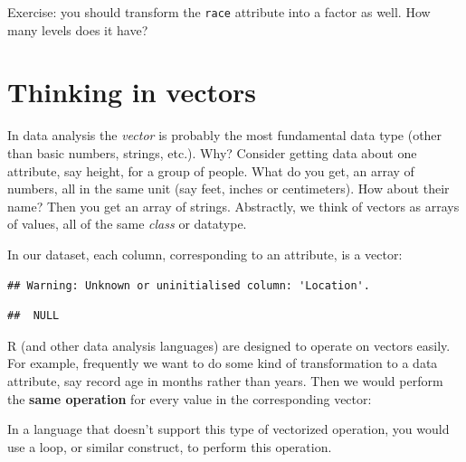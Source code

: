 \documentclass[]{book}
\newenvironment{Shaded}{\begin{snugshade}}{\end{snugshade}}
\newcommand{\KeywordTok}[1]{\textcolor[rgb]{0.13,0.29,0.53}{\textbf{#1}}}
\newcommand{\DecValTok}[1]{\textcolor[rgb]{0.00,0.00,0.81}{#1}}
\newcommand{\StringTok}[1]{\textcolor[rgb]{0.31,0.60,0.02}{#1}}
\newcommand{\CommentTok}[1]{\textcolor[rgb]{0.56,0.35,0.01}{\textit{#1}}}
\newcommand{\OperatorTok}[1]{\textcolor[rgb]{0.81,0.36,0.00}{\textbf{#1}}}
\newcommand{\NormalTok}[1]{#1}
\theoremstyle{definition}
\theoremstyle{definition}
\theoremstyle{remark}
\begin{document}
Exercise: you should transform the \texttt{race} attribute into a factor
as well. How many levels does it have?

\section{Thinking in vectors}\label{thinking-in-vectors}

In data analysis the \emph{vector} is probably the most fundamental data
type (other than basic numbers, strings, etc.). Why? Consider getting
data about one attribute, say height, for a group of people. What do you
get, an array of numbers, all in the same unit (say feet, inches or
centimeters). How about their name? Then you get an array of strings.
Abstractly, we think of vectors as arrays of values, all of the same
\emph{class} or datatype.

In our dataset, each column, corresponding to an attribute, is a vector:

\begin{Shaded}
\end{Shaded}

\begin{verbatim}
## Warning: Unknown or uninitialised column: 'Location'.
\end{verbatim}

\begin{verbatim}
##  NULL
\end{verbatim}

R (and other data analysis languages) are designed to operate on vectors
easily. For example, frequently we want to do some kind of
transformation to a data attribute, say record age in months rather than
years. Then we would perform the \textbf{same operation} for every value
in the corresponding vector:

\begin{Shaded}
\end{Shaded}

In a language that doesn't support this type of vectorized operation,
you would use a loop, or similar construct, to perform this operation.
\end{document}
